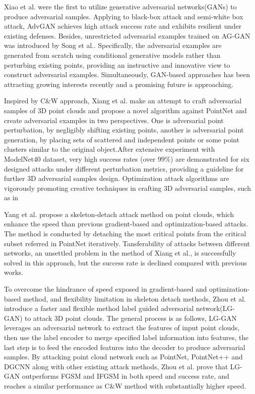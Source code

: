 Xiao et al.\cite{xiao_generating_2019} were the first to utilize generative adversarial networks(GANs) to produce adversarial samples.  Applying to black-box attack and semi-white box attack, AdvGAN achieves high attack success rate and exhibits resilient under existing defenses. Besides, unrestricted adversarial examples trained on AG-GAN\cite{odena_conditional_2017} was introduced by Song et al.\cite{song_constructing_2018}. Specifically, the adversarial examples are generated from scratch using conditional generative models rather than perturbing existing points, providing an instructive and innovative view to construct adversarial examples. Simultaneously, GAN-based approaches has been attracting growing interests recently and a promising future is approaching.

Inspired by C\&W approach, Xiang et al.\cite{xiang_generating_2019} make an attempt to craft adversarial samples of 3D point clouds and propose a novel algorithm against PointNet\cite{qi_pointnet_2017} and create adversarial examples in two perspectives. One is adversarial point perturbation, by negligibly shifting existing points, another is adversarial point generation, by placing sets of scattered and independent points or some point clusters similar to the original object.After extensive experiment with ModelNet40 dataset, very high success rates (over 99\%) are demonstrated for six designed attacks under different perturbation metrics, providing a guideline for further 3D adversarial samples design. Optimization attack algorithms are vigorously promoting creative techniques in crafting 3D adversarial samples, such as in \cite{wicker_robustness_2019,athalye_synthesizing_2018}

Yang et al.\cite{yang_adversarial_2019} propose a skeleton-detach attack method on point clouds, which enhance the speed than previous gradient-based and optimization-based attacks. The method is conducted by detaching the most critical points from the critical subset referred in PointNet iteratively. Tansferability of attacks between different networks, an unsettled problem in the method of Xiang et al.\cite{xiang_generating_2019}, is successfully solved in this approach, but the success rate is declined compared with previous works.

To overcome the hindrance of speed exposed in gradient-based and optimization-based method, and flexibility limitation in skeleton detach methods\cite{yang_adversarial_2019}, Zhou et al.\cite{zhou_lg-gan_nodate} introduce a faster and flexible method label guided adversarial network(LG-GAN) to attack 3D point clouds. The general process is as follows, LG-GAN leverages an adversarial network to extract the features of input point clouds, then use the label encoder to merge specified label information into features, the last step is to feed the encoded features into the decoder to produce adversarial samples. By attacking point cloud network such as PointNet, PointNet++ and DGCNN along with other existing attack methods, Zhou et al. prove that LG-GAN outperforms FGSM and IFGSM in both speed and success rate, and reaches a similar performance as C\&W method with substantially higher speed.

